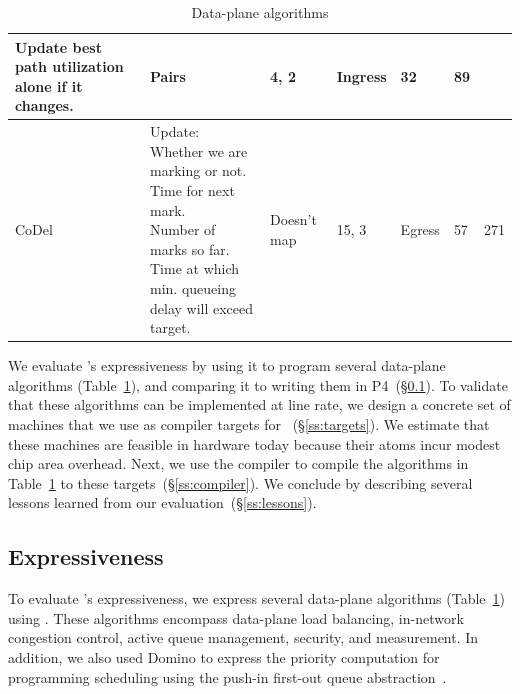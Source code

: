 \begin{table}[!t]
\begin{tabular}{|p{}|p{}|p{}|p{}|p{}|p{}|p{}|}
{                                           Update best path utilization alone if it changes.}  & Pairs & 4, 2 & Ingress & 32 & 89\\
\hline
CoDel~\cite{codel} & \pbox{0.34\textwidth}{Update:\\Whether we are marking or not.\\Time for next mark.\\Number of marks so far.\\Time at which min. queueing delay will exceed target.}& Doesn't map & 15, 3 & Egress & 57 & 271\\
\hline
\end{tabular}
\caption{Data-plane algorithms}
\label{tab:algos}
\end{table}

We evaluate \pktlanguage's expressiveness by using it to program several
data-plane algorithms (Table~\ref{tab:algos}), and comparing it to writing them
in P4~(\S\ref{ss:expressiveness}).  To validate that these algorithms can be
implemented at line rate, we design a concrete set of \absmachine machines that
we use as compiler targets for \pktlanguage~(\S\ref{ss:targets}).  We estimate
that these machines are feasible in hardware today because their atoms incur
modest chip area overhead. Next, we use the \pktlanguage compiler to compile
the algorithms in Table~\ref{tab:algos} to these targets~(\S\ref{ss:compiler}).
We conclude by describing several lessons learned from our
evaluation~(\S\ref{ss:lessons}).

\subsection{Expressiveness}
\label{ss:expressiveness}

To evaluate \pktlanguage's expressiveness, we express several data-plane
algorithms (Table~\ref{tab:algos}) using \pktlanguage. These algorithms
encompass data-plane load balancing, in-network congestion control, active
queue management, security, and measurement. In addition, we also used Domino
to express the priority computation for programming scheduling using the
push-in first-out queue abstraction~\cite{pifo_hotnets}.

